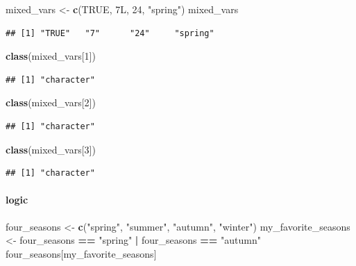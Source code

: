 \documentclass[
]{book}
\newenvironment{Shaded}{\begin{snugshade}}{\end{snugshade}}
\newcommand{\ConstantTok}[1]{\textcolor[rgb]{0.56,0.35,0.01}{#1}}
\newcommand{\DecValTok}[1]{\textcolor[rgb]{0.00,0.00,0.81}{#1}}
\newcommand{\FunctionTok}[1]{\textcolor[rgb]{0.13,0.29,0.53}{\textbf{#1}}}
\newcommand{\NormalTok}[1]{#1}
\newcommand{\OtherTok}[1]{\textcolor[rgb]{0.56,0.35,0.01}{#1}}
\newcommand{\SpecialCharTok}[1]{\textcolor[rgb]{0.81,0.36,0.00}{\textbf{#1}}}
\newcommand{\StringTok}[1]{\textcolor[rgb]{0.31,0.60,0.02}{#1}}
\theoremstyle{definition}
\theoremstyle{definition}
\theoremstyle{definition}
\theoremstyle{definition}
\theoremstyle{remark}
\begin{document}
\begin{Shaded}
\begin{Highlighting}[]
\NormalTok{mixed\_vars }\OtherTok{\textless{}{-}} \FunctionTok{c}\NormalTok{(}\ConstantTok{TRUE}\NormalTok{, 7L, }\DecValTok{24}\NormalTok{, }\StringTok{"spring"}\NormalTok{)}
\NormalTok{mixed\_vars}
\end{Highlighting}
\end{Shaded}

\begin{verbatim}
## [1] "TRUE"   "7"      "24"     "spring"
\end{verbatim}

\begin{Shaded}
\begin{Highlighting}[]
\FunctionTok{class}\NormalTok{(mixed\_vars[}\DecValTok{1}\NormalTok{])}
\end{Highlighting}
\end{Shaded}

\begin{verbatim}
## [1] "character"
\end{verbatim}

\begin{Shaded}
\begin{Highlighting}[]
\FunctionTok{class}\NormalTok{(mixed\_vars[}\DecValTok{2}\NormalTok{])}
\end{Highlighting}
\end{Shaded}

\begin{verbatim}
## [1] "character"
\end{verbatim}

\begin{Shaded}
\begin{Highlighting}[]
\FunctionTok{class}\NormalTok{(mixed\_vars[}\DecValTok{3}\NormalTok{])}
\end{Highlighting}
\end{Shaded}

\begin{verbatim}
## [1] "character"
\end{verbatim}

\hypertarget{logic}{%
\paragraph{logic}\label{logic}}

\begin{Shaded}
\begin{Highlighting}[]
\NormalTok{four\_seasons }\OtherTok{\textless{}{-}} \FunctionTok{c}\NormalTok{(}\StringTok{"spring"}\NormalTok{, }\StringTok{"summer"}\NormalTok{, }\StringTok{"autumn"}\NormalTok{, }\StringTok{"winter"}\NormalTok{)}
\NormalTok{my\_favorite\_seasons }\OtherTok{\textless{}{-}}\NormalTok{ four\_seasons }\SpecialCharTok{==} \StringTok{"spring"} \SpecialCharTok{|}\NormalTok{ four\_seasons }\SpecialCharTok{==} \StringTok{"autumn"}
\NormalTok{four\_seasons[my\_favorite\_seasons]}
\end{Highlighting}
\end{Shaded}
\end{document}
